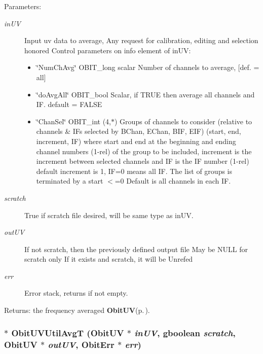 \begin{Desc}
\item[Parameters:]
\begin{description}
\item[{\em in\-UV}]Input uv data to average, Any request for calibration, editing and selection honored Control parameters on info element of in\-UV: \begin{itemize}
\item \char`\"{}Num\-Ch\-Avg\char`\"{} OBIT\_\-long scalar Number of channels to average, [def. = all] \item \char`\"{}do\-Avg\-All\char`\"{} OBIT\_\-bool Scalar, if TRUE then average all channels and IF. default = FALSE \item \char`\"{}Chan\-Sel\char`\"{} OBIT\_\-int (4,$\ast$) Groups of channels to consider (relative to channels \& IFs selected by BChan, EChan, BIF, EIF) (start, end, increment, IF) where start and end at the beginning and ending channel numbers (1-rel) of the group to be included, increment is the increment between selected channels and IF is the IF number (1-rel) default increment is 1, IF=0 means all IF. The list of groups is terminated by a start $<$=0 Default is all channels in each IF.\end{itemize}
\item[{\em scratch}]True if scratch file desired, will be same type as in\-UV. \item[{\em out\-UV}]If not scratch, then the previously defined output file May be NULL for scratch only If it exists and scratch, it will be Unrefed \item[{\em err}]Error stack, returns if not empty. \end{description}
\end{Desc}
\begin{Desc}
\item[Returns:]the frequency averaged {\bf Obit\-UV}{\rm (p.\,\pageref{structObitUV})}. \end{Desc}
\subsubsection{$\ast$ Obit\-UVUtil\-Avg\-T ({\bf Obit\-UV} $\ast$ {\em in\-UV}, gboolean {\em scratch}, {\bf Obit\-UV} $\ast$ {\em out\-UV}, {\bf Obit\-Err} $\ast$ {\em err})}\label{ObitUVUtil_8h_a7}


